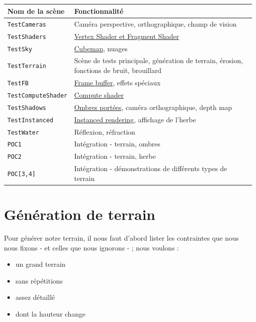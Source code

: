 \documentclass{EPUProjetDi}
\newcommand{\code}{\texttt}
\begin{document}
\paragraph{}
\begin{tabular}{|l|l|}
	\hline
	Nom de la scène & Fonctionnalité \\\hline\hline
	\code{TestCameras} & Caméra perspective, orthographique, champ de vision\\\hline
	\code{TestShaders} & \hyperref[sec:shaders]{Vertex Shader et Fragment Shader}\\\hline
	\code{TestSky} & \hyperref[sec:sky]{Cubemap}, nuages\\\hline
	\code{TestTerrain} & \makecell[l]{Scène de tests principale, génération de terrain, érosion,\\ fonctions de bruit, brouillard}\\\hline
	\code{TestFB} & \hyperref[sec:framebuffers]{Frame buffer}, effets spéciaux\\\hline
	\code{TestComputeShader} & \hyperref[sec:shaders]{Compute shader}\\\hline
	\code{TestShadows} & \hyperref[sec:casted_shadows]{Ombres portées}, caméra orthographique, depth map\\\hline
	\code{TestInstanced} & \hyperref[sec:instanced_rendering]{Instanced rendering}, affichage de l'herbe\\\hline
	\code{TestWater} & Réflexion, réfraction\\\hline
	\code{POC1} & Intégration - terrain, ombres\\\hline
	\code{POC2} & Intégration - terrain, herbe\\\hline
	\code{POC[3,4]} & Intégration - démonstrations de différents types de terrain\\\hline
\end{tabular}

\chapter{Génération de terrain}

Pour générer notre terrain, il nous faut d'abord lister les contraintes que nous nous fixons - et celles que nous ignorons - ; nous voulons :
\begin{itemize}
	\item{un grand terrain}
	\item{sans répétitions}
	\item{assez détaillé}
	\item{dont la hauteur change}
\end{itemize}
\end{document}
